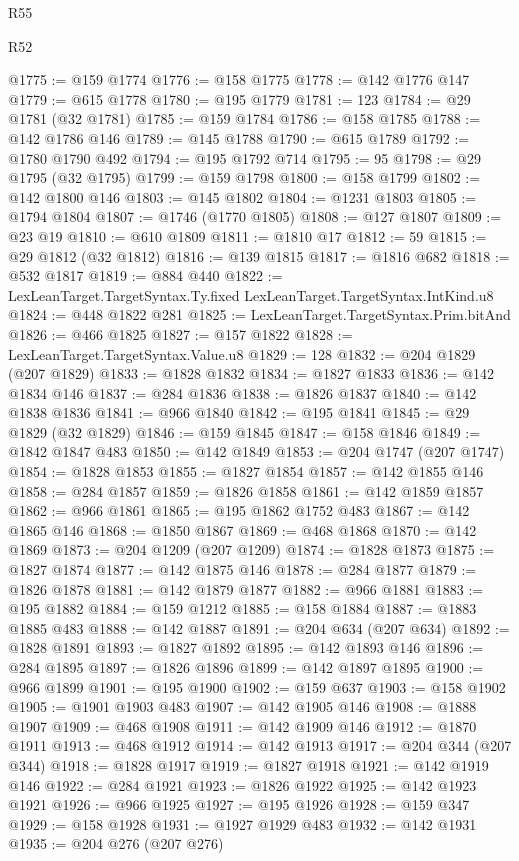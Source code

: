 \begin{lexlean}{R55}
\begin{lexlean}{R52}
\begin{coremodule}
{{{{{{{{{{{{{{{{{{{{{{{{{{{{{{{{{{{{{{{{{{{{{{{{{{{{{{{{{{{{{{{{{{{{{{{{{{{{{{{{{{{{{{{{{{{{{{{{{{{{{{{{{{{{{{{{{{{{{{{{{{{{{{{{{{{{{{{{{{{{{{{{{{{{{{{{{{{{{{{{{{{{{{{{{{{{{{{{{{{{{{{{{{{{{{{{{{{{{{@1775 := @159 @1774
@1776 := @158 @1775
@1778 := @142 @1776 @147
@1779 := @615 @1778
@1780 := @195 @1779
@1781 := 123
@1784 := @29 @1781 (@32 @1781)
@1785 := @159 @1784
@1786 := @158 @1785
@1788 := @142 @1786 @146
@1789 := @145 @1788
@1790 := @615 @1789
@1792 := @1780 @1790 @492
@1794 := @195 @1792 @714
@1795 := 95
@1798 := @29 @1795 (@32 @1795)
@1799 := @159 @1798
@1800 := @158 @1799
@1802 := @142 @1800 @146
@1803 := @145 @1802
@1804 := @1231 @1803
@1805 := @1794 @1804
@1807 := @1746 (@1770 @1805)
@1808 := @127 @1807
@1809 := @23 @19
@1810 := @610 @1809
@1811 := @1810 @17
@1812 := 59
@1815 := @29 @1812 (@32 @1812)
@1816 := @139 @1815
@1817 := @1816 @682
@1818 := @532 @1817
@1819 := @884 @440
@1822 := LexLeanTarget.TargetSyntax.Ty.fixed LexLeanTarget.TargetSyntax.IntKind.u8
@1824 := @448 @1822 @281
@1825 := LexLeanTarget.TargetSyntax.Prim.bitAnd
@1826 := @466 @1825
@1827 := @157 @1822
@1828 := LexLeanTarget.TargetSyntax.Value.u8
@1829 := 128
@1832 := @204 @1829 (@207 @1829)
@1833 := @1828 @1832
@1834 := @1827 @1833
@1836 := @142 @1834 @146
@1837 := @284 @1836
@1838 := @1826 @1837
@1840 := @142 @1838 @1836
@1841 := @966 @1840
@1842 := @195 @1841
@1845 := @29 @1829 (@32 @1829)
@1846 := @159 @1845
@1847 := @158 @1846
@1849 := @1842 @1847 @483
@1850 := @142 @1849
@1853 := @204 @1747 (@207 @1747)
@1854 := @1828 @1853
@1855 := @1827 @1854
@1857 := @142 @1855 @146
@1858 := @284 @1857
@1859 := @1826 @1858
@1861 := @142 @1859 @1857
@1862 := @966 @1861
@1865 := @195 @1862 @1752 @483
@1867 := @142 @1865 @146
@1868 := @1850 @1867
@1869 := @468 @1868
@1870 := @142 @1869
@1873 := @204 @1209 (@207 @1209)
@1874 := @1828 @1873
@1875 := @1827 @1874
@1877 := @142 @1875 @146
@1878 := @284 @1877
@1879 := @1826 @1878
@1881 := @142 @1879 @1877
@1882 := @966 @1881
@1883 := @195 @1882
@1884 := @159 @1212
@1885 := @158 @1884
@1887 := @1883 @1885 @483
@1888 := @142 @1887
@1891 := @204 @634 (@207 @634)
@1892 := @1828 @1891
@1893 := @1827 @1892
@1895 := @142 @1893 @146
@1896 := @284 @1895
@1897 := @1826 @1896
@1899 := @142 @1897 @1895
@1900 := @966 @1899
@1901 := @195 @1900
@1902 := @159 @637
@1903 := @158 @1902
@1905 := @1901 @1903 @483
@1907 := @142 @1905 @146
@1908 := @1888 @1907
@1909 := @468 @1908
@1911 := @142 @1909 @146
@1912 := @1870 @1911
@1913 := @468 @1912
@1914 := @142 @1913
@1917 := @204 @344 (@207 @344)
@1918 := @1828 @1917
@1919 := @1827 @1918
@1921 := @142 @1919 @146
@1922 := @284 @1921
@1923 := @1826 @1922
@1925 := @142 @1923 @1921
@1926 := @966 @1925
@1927 := @195 @1926
@1928 := @159 @347
@1929 := @158 @1928
@1931 := @1927 @1929 @483
@1932 := @142 @1931
@1935 := @204 @276 (@207 @276)
}}}}}}}}}}}}}}}}}}}}}}}}}}}}}}}}}}}}}}}}}}}}}}}}}}}}}}}}}}}}}}}}}}}}}}}}}}}}}}}}}}}}}}}}}}}}}}}}}}}}}}}}}}}}}}}}}}}}}}}}}}}}}}}}}}}}}}}}}}}}}}}}}}}}}}}}}}}}}}}}}}}}}}}}}}}}}}}}}}}}}}}}}}}}}}}}}}}}}}
\end{coremodule}
\end{lexlean}
\end{lexlean}
